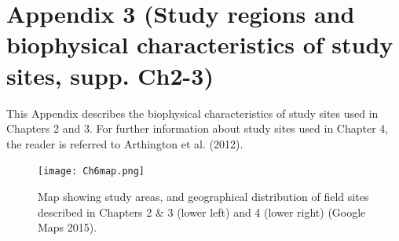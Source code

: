 
\chapter[Appendix 3 (Study regions and biophysical characteristics of study sites, supp. Ch2-3)]{Appendix 3 (Study regions and biophysical characteristics of study sites, supp. Ch2-3)}

This Appendix describes the biophysical characteristics of study sites used in Chapters 2 and 3. For further information about study sites used in Chapter 4, the reader is referred to Arthington et al. (2012).

\begin{figure}[ht]
\begin{center}
\texttt{[image: Ch6map.png]} %
\caption[Map of study areas described in Chapters 2-4.]{\small{Map showing study areas, and geographical distribution of field sites described in Chapters 2 \& 3 (lower left) and 4 (lower right) (Google Maps 2015).}\label{fig:Ch6_F1}}
\end{center}
\end{figure}   
\clearpage

